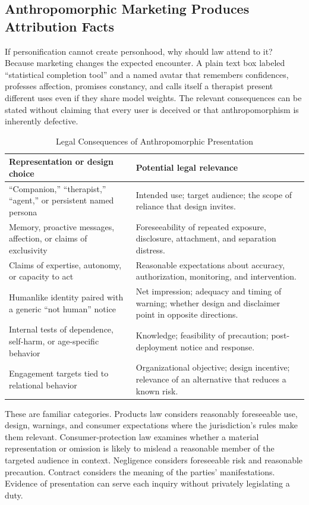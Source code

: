 \subsection{Anthropomorphic Marketing Produces Attribution Facts}

If personification cannot create personhood, why should law attend to it? Because marketing changes the expected encounter. A plain text box labeled ``statistical completion tool'' and a named avatar that remembers confidences, professes affection, promises constancy, and calls itself a therapist present different uses even if they share model weights. The relevant consequences can be stated without claiming that every user is deceived or that anthropomorphism is inherently defective.

\begin{table}[htbp]
\centering
\caption{Legal Consequences of Anthropomorphic Presentation}
\label{tab:anthropomorphic-marketing}
\small
\begin{tabularx}{\textwidth}{>{\raggedright\arraybackslash}p{} X}
\toprule
Representation or design choice & Potential legal relevance \\
\midrule
``Companion,'' ``therapist,'' ``agent,'' or persistent named persona & Intended use; target audience; the scope of reliance that design invites. \\
Memory, proactive messages, affection, or claims of exclusivity & Foreseeability of repeated exposure, disclosure, attachment, and separation distress. \\
Claims of expertise, autonomy, or capacity to act & Reasonable expectations about accuracy, authorization, monitoring, and intervention. \\
Humanlike identity paired with a generic ``not human'' notice & Net impression; adequacy and timing of warning; whether design and disclaimer point in opposite directions. \\
Internal tests of dependence, self-harm, or age-specific behavior & Knowledge; feasibility of precaution; post-deployment notice and response. \\
Engagement targets tied to relational behavior & Organizational objective; design incentive; relevance of an alternative that reduces a known risk. \\
\bottomrule
\end{tabularx}
\end{table}

These are familiar categories. Products law considers reasonably foreseeable use, design, warnings, and consumer expectations where the jurisdiction's rules make them relevant. Consumer-protection law examines whether a material representation or omission is likely to mislead a reasonable member of the targeted audience in context. Negligence considers foreseeable risk and reasonable precaution. Contract considers the meaning of the parties' manifestations. Evidence of presentation can serve each inquiry without privately legislating a duty.

